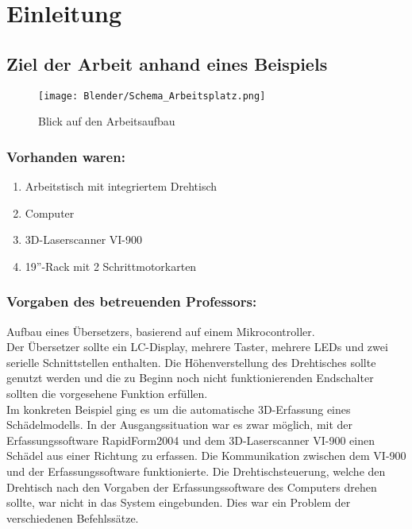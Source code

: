 \chapter{Einleitung}
\label{cha:Einleitung}

\section{Ziel der Arbeit anhand eines Beispiels} 
\label{sec:ZielDerArbeit}
\begin{figure}[htb]
\centering
\texttt{[image: Blender/Schema\_Arbeitsplatz.png]}
\caption{Blick auf den Arbeitsaufbau}
\label{fig:Übersicht}
\end{figure}

\subsection{Vorhanden waren:}
\begin{enumerate}
\item Arbeitstisch mit integriertem Drehtisch
\item Computer
\item 3D-Laserscanner VI-900
\item 19''-Rack mit 2 Schrittmotorkarten
\end{enumerate}
\subsection{Vorgaben des betreuenden Professors:}
Aufbau eines Übersetzers, basierend auf einem Mikrocontroller.\\
Der Übersetzer sollte ein LC-Display, mehrere Taster, mehrere LEDs und zwei serielle Schnittstellen enthalten.
Die Höhenverstellung des Drehtisches sollte genutzt werden und die zu Beginn noch nicht funktionierenden Endschalter sollten die vorgesehene Funktion erfüllen.\\
Im konkreten Beispiel ging es um die automatische 3D-Erfassung eines Schädelmodells. In der Ausgangssituation war es zwar möglich, mit der Erfassungssoftware RapidForm2004 und dem 3D-Laserscanner VI-900  einen Schädel aus einer Richtung zu erfassen. Die Kommunikation zwischen dem VI-900 und der Erfassungssoftware funktionierte. Die Drehtischsteuerung, welche den Drehtisch nach den Vorgaben der Erfassungssoftware des Computers drehen sollte, war nicht in das System eingebunden. Dies war ein Problem der verschiedenen Befehlssätze.\\
